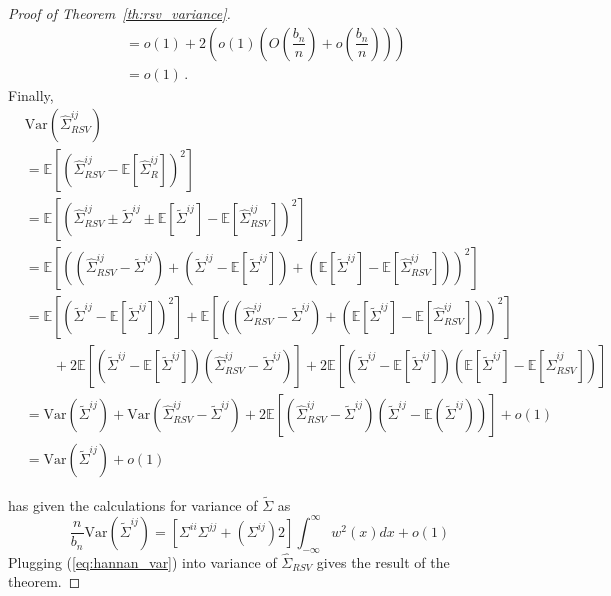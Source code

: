 \documentclass[11pt]{article}
\newcommand{\E}{\mathbb{E}}
\newcommand{\Var}{\text{Var}}
\theoremstyle{remark}
\begin{document}
\begin{proof}[Proof of Theorem~\ref{th:rsv_variance}]
\begin{align*}
& = o(1) + 2\left(o(1) \left(O\left( \dfrac{b_n}{n}\right)  + o\left( \dfrac{b_n}{n}\right) \right)  \right) \\ 
& = o(1)\,.
\end{align*}
%
Finally,
\begin{align*}
 & \Var\left(\hat{\Sigma}_{RSV}^{ij} \right)\\
  & = \E \left[ \left(\hat{\Sigma}_{RSV}^{ij}  - \E \left[\hat{\Sigma}_{R}^{ij}  \right] \right)^2 \right]\\
& = \E \left[ \left(\hat{\Sigma}_{RSV}^{ij} \pm \tilde{\Sigma}^{ij} \pm \E \left[ \tilde{\Sigma}^{ij}\right] - \E \left[\hat{\Sigma}_{RSV}^{ij}  \right] \right)^2 \right]\\
& = \E\left[ \left( \left(\hat{\Sigma}_{RSV}^{ij} - \tilde{\Sigma}^{ij} \right) + \left(\tilde{\Sigma}^{ij}  - \E\left[\tilde{\Sigma}^{ij}\right]\right) + \left(\E\left[\tilde{\Sigma}^{ij}\right] - \E \left[\hat{\Sigma}_{RSV}^{ij}  \right] \right)  \right)^2 \right] \\ 
& =  \E\left[ \left(\tilde{\Sigma}^{ij}  - \E\left[\tilde{\Sigma}^{ij}\right]\right)^2 \right] + \E \left[ \left(\left(\hat{\Sigma}_{RSV}^{ij} - \tilde{\Sigma}^{ij} \right) + \left(\E\left[\tilde{\Sigma}^{ij}\right] - \E \left[\hat{\Sigma}_{RSV}^{ij}  \right] \right) \right)^2 \right] \\
& \quad \quad + 2\E\left[\left(\tilde{\Sigma}^{ij}  - \E\left[\tilde{\Sigma}^{ij}\right]\right) \left(\hat{\Sigma}_{RSV}^{ij} - \tilde{\Sigma}^{ij} \right)\right] + 2 \E\left[\left(\tilde{\Sigma}^{ij}  - \E\left[\tilde{\Sigma}^{ij}\right]\right) \left(\E \left[\tilde{\Sigma}^{ij}\right] - \E \left[\hat{\Sigma}_{RSV}^{ij}  \right] \right)\right]\\
& = \Var\left( \tilde{\Sigma}^{ij}\right) + \Var\left(\hat{\Sigma}_{RSV}^{ij} - \tilde{\Sigma}^{ij} \right) + 2 \E\left[ \left(\hat{\Sigma}_{RSV}^{ij} -  \tilde{\Sigma}^{ij} \right) \left(\tilde{\Sigma}^{ij}  - \E \left( \tilde{\Sigma}^{ij} \right) \right) \right] + o(1)\\
& = \Var\left( \tilde{\Sigma}^{ij}\right) + o(1)
\end{align*}

\cite{hannan2009multiple} has given the calculations for variance of $\tilde{\Sigma}$ as 
\begin{equation} \label{eq:hannan_var}
\dfrac{n}{b_n}\Var(\tilde{\Sigma}^{ij}) = [\Sigma^{ii}\Sigma^{jj} + \left(\Sigma^{ij} \right)2]\int_{-\infty}^{\infty}w^2(x)dx + o(1)    
\end{equation}
Plugging (\ref{eq:hannan_var}) into variance of $\hat{\Sigma}_{RSV}$ gives the result of the theorem.
 
\end{proof}

\singlespacing


\end{document}
